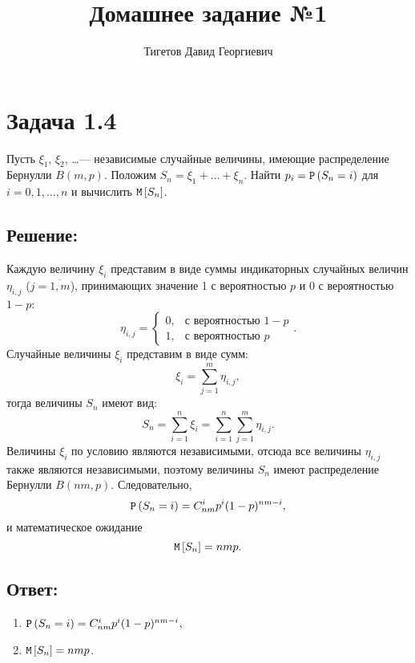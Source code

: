 \documentclass[12pt]{article}
\begin{document}
    \title{Домашнее задание №1}
    \author{Тигетов Давид Георгиевич}
    \date{}
    \maketitle

    \section*{Задача 1.4}
    Пусть $\xi_1$, $\xi_2$, \dots --- независимые случайные величины, имеющие распределение Бернулли $B(m, p)$. Положим $S_n = \xi_1 + \dots + \xi_n$. Найти $p_i = \mathtt{P} \left ( S_n = i \right )$
    для $i = 0, 1, \dots, n$ и вычислить $\mathtt{M} \left [ S_n \right ]$.

    \subsection*{Решение:}
    Каждую величину $\xi_i$ представим в виде суммы индикаторных случайных величин $\eta_{i,j}$ ($j=\overline{1,m}$), принимающих значение 1 с вероятностью $p$ и 0 с вероятностью $1-p$:
    \[
        \eta_{i,j}
        = \left \{
        \begin{array}{ll}
            0, & \text{с вероятностью } 1-p \\
            1, & \text{с вероятностью } p
        \end{array}
        \right .
        .
    \]
    Случайные величины $\xi_i$ представим в виде сумм:
    \[
        \xi_i = \sum_{j=1}^m \eta_{i,j} ,
    \]
    тогда величины $S_n$ имеют вид:
    \[
        S_n = \sum_{i=1}^n \xi_i = \sum_{i=1}^n \sum_{j=1}^m \eta_{i,j} .
    \]
    Величины $\xi_i$ по условию являются независимыми, отсюда все величины $\eta_{i,j}$ также являются независимыми, поэтому величины $S_n$ имеют распределение Бернулли $B(nm, p)$.
    Следовательно,
    \[
        \mathtt{P} \left ( S_n = i \right ) = C_{nm}^i p^i (1-p)^{nm-i} ,
    \]
    и математическое ожидание
    \[
        \mathtt{M} \left [ S_n \right ] = n m p.
    \]

    \subsection*{Ответ:}
    \begin{enumerate}
        \item $\mathtt{P} \left ( S_n = i \right ) = C_{nm}^i p^i (1-p)^{nm-i}$,
        \item $\mathtt{M} \left [ S_n \right ] = n m p$.
    \end{enumerate}
\end{document}
